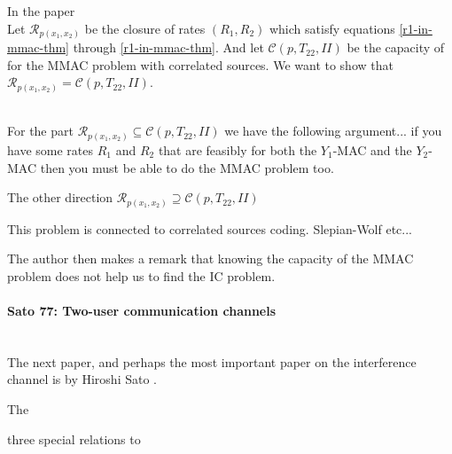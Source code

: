 \documentclass[aps,11pt,twoside,letterpaper]{article}
\begin{document}
        In the paper 
         \\
        Let $\mathcal{R}_{p(x_1,x_2)}$ be the closure  of rates $(R_1,R_2)$ which
        satisfy equations  \eqref{r1-in-mmac-thm} through \eqref{r1-in-mmac-thm}.
        And let $\mathcal{C}(p,T_{22},II)$ be the capacity of for the MMAC problem with correlated sources.
        We want to show that $\mathcal{R}_{p(x_1,x_2)} = \mathcal{C}(p,T_{22},II)$.



         \\
        For the part $\mathcal{R}_{p(x_1,x_2)} \subseteq \mathcal{C}(p,T_{22},II)$ we have the following argument...
        if you have some rates $R_1$ and $R_2$ that are feasibly for both the $Y_1$-MAC and the $Y_2$-MAC then
        you must be able to do the MMAC problem too.
        
        The other direction $\mathcal{R}_{p(x_1,x_2)} \supseteq \mathcal{C}(p,T_{22},II)$  



        This problem is connected to correlated sources coding. Slepian-Wolf etc...


        The author then makes a remark that knowing the capacity of the MMAC problem
        does not help us to find the IC problem.
        




        \paragraph{Sato 77: Two-user communication channels} \ \\

        The next paper, and perhaps the most important paper on the interference channel is
        by Hiroshi Sato \cite{Sato77}.

        The 
        
        three special relations to 
\end{document}
